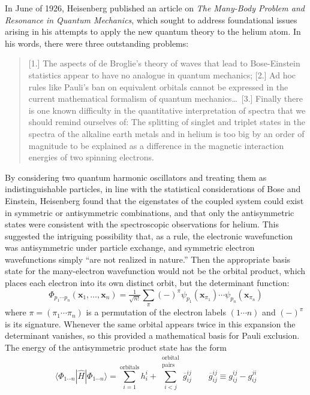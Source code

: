 In June of 1926, Heisenberg published an article on {\itshape The Many-Body
Problem and Resonance in Quantum Mechanics}, which sought to address
foundational issues arising in his attempts to apply the new quantum theory to
the helium atom.
In his words, there were three outstanding problems:
\begin{quote}
    [1.] The aspects of de Broglie's theory of waves that lead to Bose-Einstein
    statistics appear to have no analogue in quantum mechanics;
    [2.] Ad hoc rules like Pauli's ban on equivalent orbitals cannot be
    expressed in the current mathematical formalism of quantum mechanics\dots\ 
    [3.] Finally there is one known difficulty in the quantitative
    interpretation of spectra that we should remind ourselves of:
    The splitting of singlet and triplet states in the spectra of the alkaline
    earth metals and in helium is too big by an order of magnitude to be
    explained as a difference in the magnetic interaction energies of two
    spinning electrons.\cite{Heisenberg:1926p411}
\end{quote}
By considering two quantum harmonic oscillators and treating them as
indistinguishable particles, in line with the statistical considerations of Bose
and Einstein,\cite{Bose:1924p178,Einstein:1924p261,Einstein:1925p3} Heisenberg
found that the eigenstates of the coupled system could exist in symmetric or
antisymmetric combinations, and that only the antisymmetric states were
consistent with the spectroscopic observations for helium.
This suggested the intriguing possibility that, as a rule, the electronic
wavefunction was antisymmetric under particle exchange, and symmetric electron
wavefunctions simply ``are not realized in nature.''\cite{Heisenberg:1926p411}
Then the appropriate basis state for the many-electron wavefunction would not be
the orbital product, which places each electron into its own distinct orbit, but
the determinant function:
\begin{equation}
    \Phi_{p_1\cdots p_n}(\mathbf{x}_1, \ldots, \mathbf{x}_n)
    =
    \tfrac{1}{\sqrt{n!}}
    \sum_\pi
    (-)^\pi
    \psi_{p_1}(\mathbf{x}_{\pi_1})
    \cdots
    \psi_{p_n}(\mathbf{x}_{\pi_n})
\end{equation}
where \(\pi=(\pi_1\cdots \pi_n)\) is a permutation of the electron labels
\((1\cdots n)\) and \((-)^\pi\) is its signature.
Whenever the same orbital appears twice in this expansion the determinant
vanishes, so this provided a mathematical basis for Pauli exclusion.
The energy of the antisymmetric product state has the form
\begin{equation}
    \label{eq:introduction:determinant-expectation-value}
    \langle \Phi_{1\cdots n}|
    \hat{H}
    |\Phi_{1\cdots n} \rangle
    =
    \sum_{i=1}^\mathrm{orbitals}
    h_i^i
    +
    \sum_{i<j}^{\substack{\mathrm{orbital}\\\mathrm{pairs}}}
    \overline{g}_{ij}^{ij}
    \qquad
    \overline{g}_{ij}^{ij}
    \equiv
    g_{ij}^{ij}
    -
    g_{ij}^{ji}
\end{equation}
